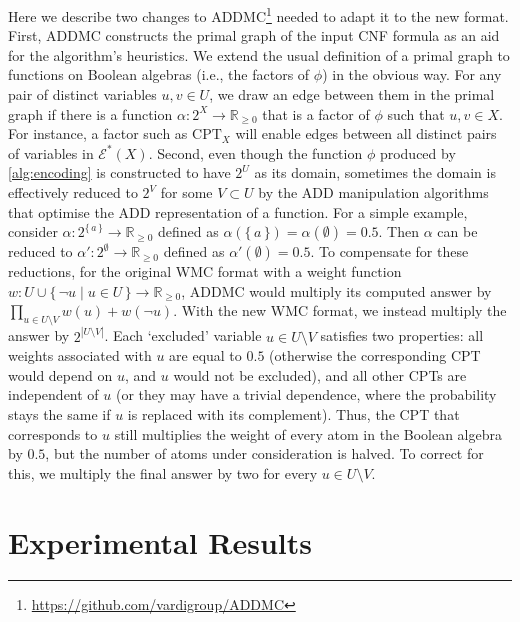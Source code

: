 Here we describe two changes to
\textsc{ADDMC}\footnote{\url{https://github.com/vardigroup/ADDMC}}
\citep{DBLP:conf/aaai/DudekPV20} needed to adapt it to the new format. First,
\textsc{ADDMC} constructs the primal graph of the input CNF formula as an aid
for the algorithm's heuristics. We extend the usual definition of a primal graph
to functions on Boolean algebras (i.e., the factors of $\phi$) in the obvious
way. For any pair of distinct variables $u, v \in U$, we draw an edge between
them in the primal graph if there is a function
$\alpha\colon 2^X \to \mathbb{R}_{\ge 0}$ that is a factor of $\phi$ such that
$u, v \in X$. For instance, a factor such as $\mathrm{CPT}_X$ will enable edges
between all distinct pairs of variables in $\mathcal{E}^*(X)$. Second, even
though the function $\phi$ produced by \cref{alg:encoding} is constructed to
have $2^U$ as its domain, sometimes the domain is effectively reduced to $2^V$
for some $V \subset U$ by the ADD manipulation algorithms that optimise the ADD
representation of a function. For a simple example, consider
$\alpha: 2^{\{\, a \,\}} \to \mathbb{R}_{\ge 0}$ defined as
$\alpha(\{\, a \,\}) = \alpha(\emptyset) = 0.5$. Then $\alpha$ can be reduced to
$\alpha'\colon 2^{\emptyset} \to \mathbb{R}_{\ge 0}$ defined as
$\alpha'(\emptyset) = 0.5$. To compensate for these reductions, for the original
WMC format with a weight function
$w\colon U \cup \{\, \neg u \mid u \in U \,\} \to \mathbb{R}_{\ge 0}$,
\textsc{ADDMC} would multiply its computed answer by
$\prod_{u \in U \setminus V} w(u) + w(\neg u)$. With the new WMC format, we
instead multiply the answer by $2^{|U \setminus V|}$. Each `excluded' variable
$u \in U \setminus V$ satisfies two properties: all weights associated with $u$
are equal to $0.5$ (otherwise the corresponding CPT would depend on $u$, and $u$
would not be excluded), and all other CPTs are independent of $u$ (or they may
have a trivial dependence, where the probability stays the same if $u$ is
replaced with its complement). Thus, the CPT that corresponds to $u$ still
multiplies the weight of every atom in the Boolean algebra by $0.5$, but the
number of atoms under consideration is halved. To correct for this, we multiply
the final answer by two for every $u \in U \setminus V$.

\section{Experimental Results}\label{sec:2experiments}

